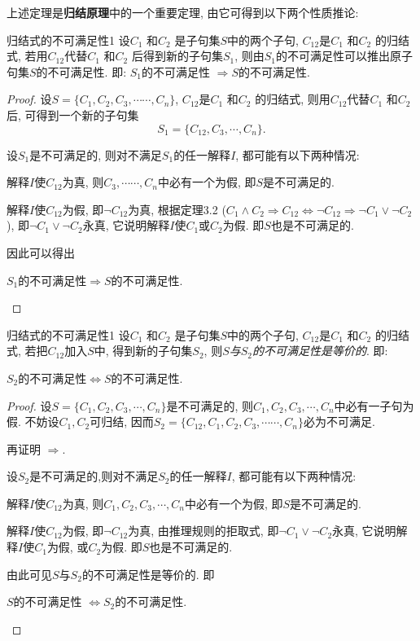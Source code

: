 上述定理是\textbf{归结原理}中的一个重要定理, 由它可得到以下两个性质推论:
\begin{myprop}{归结式的不可满足性}{1}
    设$C_1$ 和$C_2$ 是子句集$S$中的两个子句, $C_{1 2}$是$C_1$ 和$C_2$ 的归结式, 若用$C_{1 2}$代替$C_1$ 和$C_2$ 后得到新的子句集$S_1$, 则由$S_1$的不可满足性可以推出原子句集$S$的不可满足性. 即: $S_1$的不可满足性 $\Rightarrow  S$的不可满足性.
\end{myprop}
\begin{proof}
    设$S=\{ C_1 , C_2 , C_3, \cdots \cdots , C_n\}$, $C_{1 2}$是$C_1$ 和$C_2$ 的归结式, 则用$C_{1 2}$代替$C_1$ 和$C_2$ 后, 可得到一个新的子句集$$S_1=\{C_{1 2}, C_3, \cdots , C_n\}.$$

设$S_1$是不可满足的, 则对不满足$S_1$的任一解释$I$, 都可能有以下两种情况:

  解释$I$使$C_{1 2}$为真, 则$C_3, \cdots \cdots, C_n$中必有一个为假, 即$S$是不可满足的.

  解释$I$使$C_{1 2}$为假, 即$\neg C_{1 2}$为真, 根据定理3.2 ($C_1 \wedge C_2\Rightarrow C_{12} \Leftrightarrow \neg C_{12}\Rightarrow \neg C_1 \vee \neg C_2$), 即$\neg C_1 \vee \neg C_2 $永真, 它说明解释$I$使$C_1$或$C_2$为假. 即$S$也是不可满足的.

因此可以得出
\begin{center}
  $S_1$的不可满足性$\Rightarrow S$的不可满足性.
\end{center}
\end{proof}
\begin{myprop}{归结式的不可满足性}{1}
    设$C_1$ 和$C_2$ 是子句集$S$中的两个子句, $C_{1 2}$是$C_1$ 和$C_2$ 的归结式, 若把$C_{1 2}$加入$S$中, 得到新的子句集$S_2$, 则\emph{$S$与$S_2$的不可满足性是等价的}. 即:
\begin{center}
    $S_2$的不可满足性$\Leftrightarrow S$的不可满足性.
\end{center}\end{myprop}
\begin{proof}
设$S=\{C_1, C_2, C_3, \cdots, C_n\}$是不可满足的, 则$C_1, C_2, C_3, \cdots, C_n$中必有一子句为假. 不妨设$C_1, C_2$可归结, 因而$S_2=\{C_{12}, C_1, C_2, C_3, \cdots \cdots , C_n\}$必为不可满足.

再证明 $\Rightarrow$.

设$S_2$是不可满足的,则对不满足$S_2$的任一解释$I$, 都可能有以下两种情况:

     \quad{} 解释$I$使$C_{1 2}$为真, 则$C_1, C_2, C_3, \cdots, C_n$中必有一个为假, 即$S$是不可满足的.

     \quad{} 解释$I$使$C_{1 2}$为假, 即$\neg C_{1 2}$为真, 由推理规则的拒取式, 即$\neg C_1 \vee \neg C_2 $永真, 它说明解释$I$使$C_1$为假, 或$C_2$为假. 即$S$也是不可满足的.

     由此可见$S$与$S_2$的不可满足性是等价的. 即
     \begin{center}
     	$S$的不可满足性 $\Leftrightarrow S_2$的不可满足性.
     \end{center}
\end{proof}

